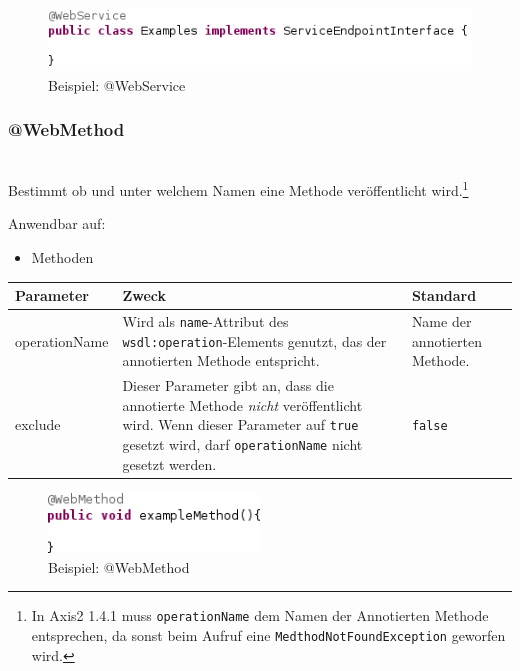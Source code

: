 \documentclass[runningheads]{llncs}
\newcommand{\anntabwidth}{\textwidth}
\begin{document}
    \begin{figure}[tbh]
      \centering
      \includegraphics[width=\textwidth]{../images/AtWebService.png}
      \caption{Beispiel: @WebService}
      \label{fig:ws}
    \end{figure} \vfill

    \subsubsection{@WebMethod}\ \\
      Bestimmt ob und unter welchem Namen eine Methode veröffentlicht wird.\footnote{In Axis2 1.4.1
      muss \texttt{operationName} dem Namen der Annotierten Methode entsprechen, da sonst beim
      Aufruf eine \texttt{MedthodNotFoundException} geworfen wird.}

      \noindent{}Anwendbar auf:
      \begin{itemize}
       \item Methoden\vfill
      \end{itemize}
    \tymin=75pt
    \begin{tabulary}{\anntabwidth}{|l|L|L|}
    \hline
    \textbf{Parameter} & \textbf{Zweck} & \textbf{Standard} \\
    \hline
      operationName &
      Wird als \texttt{name}-Attribut des \texttt{wsdl:operation}-Elements genutzt, das der
      annotierten Methode entspricht. &
      Name der annotierten Methode. \\
    \hline
      exclude &
      Dieser Parameter gibt an, dass die annotierte Methode \emph{nicht} veröffentlicht wird.
      \newline Wenn dieser Parameter auf \texttt{true} gesetzt wird, darf \texttt{operationName}
      nicht gesetzt werden. &
      \texttt{false} \\
    \hline
    \end{tabulary} \vfill
    \tymin=10pt
    \begin{figure}[tbh]
      \centering
      \includegraphics[width=0.5\textwidth]{../images/AtWebMethod.png}
      \caption{Beispiel: @WebMethod}
      \label{fig:wm}
    \end{figure}
\end{document}
